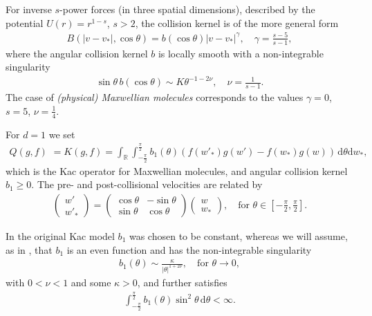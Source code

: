 \documentclass[11pt,a4paper,reqno]{amsart}
\theoremstyle{plain}
\theoremstyle{definition}
\begin{document}
For inverse $s$-power forces (in three spatial dimensions), described by the potential $U(r) = r^{1-s}$, $s>2$, the collision kernel is of the more general form
\begin{align*}
	B(|v-v_*|, \cos\theta) = b(\cos\theta) |v-v_*|^{\gamma}, \quad \gamma = \frac{s-5}{s-1},
\end{align*}
where the angular collision kernel $b$ is locally smooth with a non-integrable singularity
\begin{align*}
	\sin\theta \, b(\cos\theta) \sim K \theta^{-1-2\nu}, \quad \nu = \frac{1}{s-1}.
\end{align*}
The case of \emph{(physical) Maxwellian molecules} corresponds to the values $\gamma=0$, $s=5$, $\nu=\frac{1}{4}$.

For $d=1$ we set
\begin{align}
	Q(g,f)\,\, = K(g,f) = \int_{\mathbb{R}} \int_{-\tfrac{\pi}{2}}^{\tfrac{\pi}{2}} b_1(\theta) \left( f(w'_*) g(w') - f(w_*) g(w) \right) \, \mathrm{d}\theta \mathrm{d} w_*,
\end{align}
which is the Kac operator for Maxwellian molecules, and angular collision kernel $b_1\geq 0$.
The pre- and post-collisional velocities are related by
\begin{align*}
	\begin{pmatrix} w' \\ w'_* \end{pmatrix} = \begin{pmatrix} \cos \theta & - \sin\theta \\  \sin\theta & \cos\theta \end{pmatrix} \begin{pmatrix} w \\ w_* \end{pmatrix}, \quad \text{for } \theta \in [-\tfrac{\pi}{2}, \tfrac{\pi}{2}].
\end{align*}

In the original Kac model $b_1$ was chosen to be constant, whereas we will assume, as in \cite{Des03}, that $b_1$ is an even function and has the non-integrable singularity
\begin{align}\label{eq:cross-section-kac}
	b_1(\theta) \sim \frac{\kappa}{|\theta|^{1+2\nu}}, \quad \text{for } \theta \to 0,
\end{align}
with $0<\nu<1$ and some $\kappa>0$, and further satisfies
\begin{align}\label{eq:cross-section-kac2}
	\int_{-\tfrac{\pi}{2}}^{\tfrac{\pi}{2}} b_1(\theta) \sin^2\theta \,\mathrm{d}\theta < \infty.
\end{align}
\end{document}
